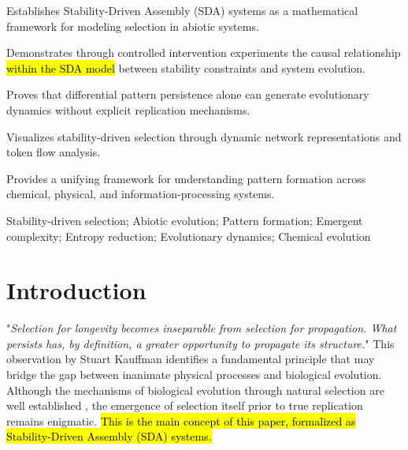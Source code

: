 \documentclass[preprint,12pt]{elsarticle}
\newcommand{\added}[1]{\hl{#1}}
\begin{document}
\begin{frontmatter}
\begin{highlights}
\item Establishes Stability-Driven Assembly (SDA) systems as a mathematical framework for modeling selection in abiotic systems.
\item Demonstrates through controlled intervention experiments the causal relationship \added{within the SDA model} between stability constraints and system evolution.
\item Proves that differential pattern persistence alone can generate evolutionary dynamics without explicit replication mechanisms.
\item Visualizes stability-driven selection through dynamic network representations and token flow analysis.
\item Provides a unifying framework for understanding pattern formation across chemical, physical, and information-processing systems.
\end{highlights}

\begin{keyword}
Stability-driven selection; Abiotic evolution; Pattern formation; Emergent complexity; Entropy reduction; Evolutionary dynamics; Chemical evolution
\end{keyword}




\end{frontmatter}


\section{Introduction}

"\textit{Selection for longevity becomes inseparable from selection for propagation. What persists has, by definition, a greater opportunity to propagate its structure.}" This observation by Stuart Kauffman \cite{kauffman1995home} identifies a fundamental principle that may bridge the gap between inanimate physical processes and biological evolution. Although the mechanisms of biological evolution through natural selection are well established \cite{fisher1930genetical}, the emergence of selection itself prior to true replication remains enigmatic. \added{This is the main concept of this paper, formalized as Stability-Driven Assembly (SDA) systems.}
\end{document}

